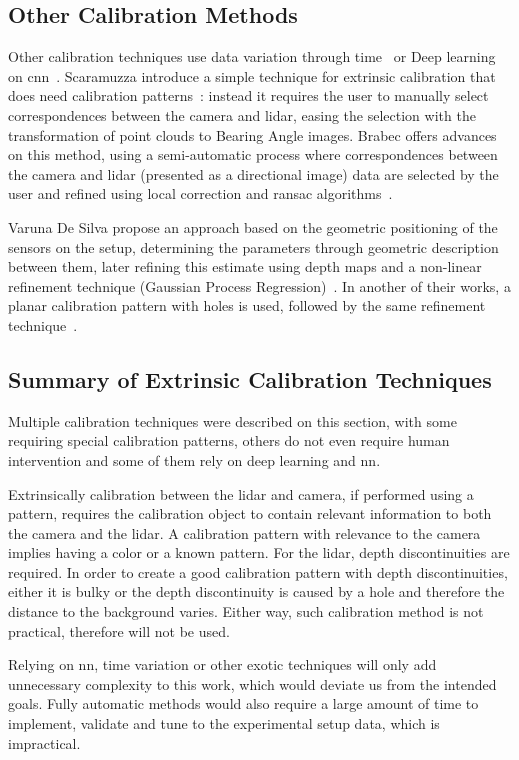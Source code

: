 \subsection{Other Calibration Methods}
Other calibration techniques use data variation through time~\cite{Chien2017} or Deep learning on \ac{cnn}~\cite{Wang2018a}. Scaramuzza \etal introduce a simple technique for extrinsic calibration that does need calibration patterns~\cite{Scaramuzza}: instead it requires the user to manually select correspondences between the camera and \ac{lidar}, easing the selection with the transformation of point clouds to Bearing Angle images. Brabec offers advances on this method, using a semi-automatic process where correspondences between the camera and \ac{lidar} (presented as a directional image) data are selected by the user and refined using local correction and \ac{ransac} algorithms~\cite{brabec2014}.

Varuna De Silva \etal propose an approach based on the geometric positioning of the sensors on the setup, determining the parameters through geometric description between them, later refining this estimate using depth maps and a non-linear refinement technique (Gaussian Process Regression)~\cite{Silva2018}. In another of their works, a planar calibration pattern with holes is used, followed by the same refinement technique~\cite{Silva2018}.


\subsection{Summary of Extrinsic Calibration Techniques}
Multiple calibration techniques were described on this section, with some requiring special calibration patterns, others do not even require human intervention and some of them rely on deep learning and \ac{nn}. 

Extrinsically calibration between the \ac{lidar} and camera, if performed using a pattern,  requires the calibration object to contain relevant information to both the camera and the \ac{lidar}. A calibration pattern with relevance to the camera implies having a color or a known pattern. For the \ac{lidar}, depth discontinuities are required. In order to create a good calibration pattern with depth discontinuities, either it is bulky or the depth discontinuity is caused by a hole and therefore the distance to the background varies. Either way, such calibration method is not practical, therefore will not be used.

Relying on \ac{nn}, time variation or other exotic techniques will only add unnecessary complexity to this work, which would deviate us from the intended goals. Fully automatic methods would also require a large amount of time to implement, validate and tune to the experimental setup data, which is impractical.


